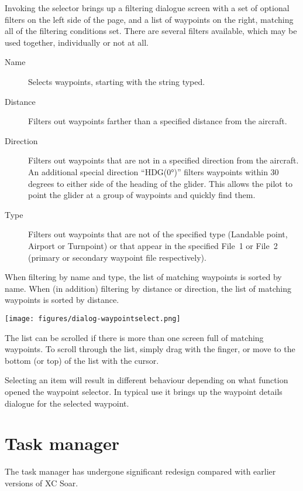 Invoking the selector brings up a filtering dialogue screen with a set of
optional filters on the left side of the page, and a list of waypoints on the
right, matching all of the filtering conditions set.
There are several filters available, which may be used together,
individually or not at all.
\begin{description}
\item[Name] Selects waypoints, starting with the string typed.
\item[Distance] Filters out waypoints farther than a specified distance from the
  aircraft.
\item[Direction] Filters out waypoints that are not in a specified direction
  from the aircraft.
  An additional special direction ``HDG(0°)'' filters waypoints within 30
  degrees to either side of the heading of the glider.  This allows the pilot
  to point the glider at a group of waypoints and quickly find them.
\item[Type] Filters out waypoints that are not of the specified type
(Landable point, Airport or Turnpoint) or that appear in the specified File~1 or
File~2 (primary or secondary waypoint file respectively).
\end{description}
When filtering by name and type, the list of matching waypoints is
sorted by name. When (in addition) filtering by distance or direction,
 the list of matching waypoints is sorted by distance.

\begin{center}
\texttt{[image: figures/dialog-waypointselect.png]}
\end{center}

The list can be scrolled if there is more than one screen full of
matching waypoints.  To scroll through the list, simply drag with the finger, or
move to the bottom (or top) of the list with the cursor.

Selecting an item will result in different behaviour
depending on what function opened the waypoint selector.  In typical
use it brings up the waypoint details dialogue for the selected
waypoint.

\section{Task manager}\label{sec:task-manager-dialog}
\begin{it}  The task manager has undergone significant redesign compared with
earlier versions of XC Soar.\end{it}


